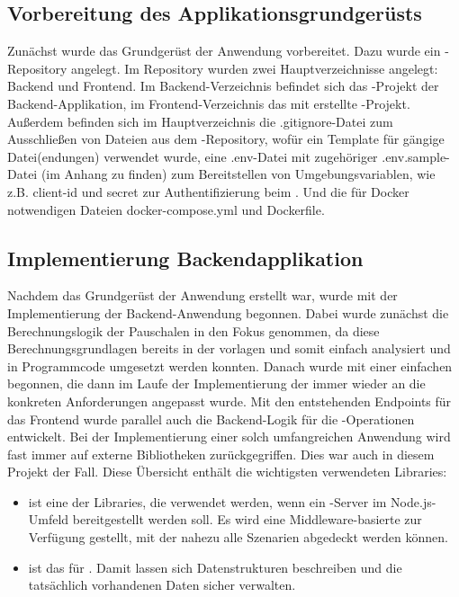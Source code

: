 \subsection{Vorbereitung des Applikationsgrundgerüsts}

Zunächst wurde das Grundgerüst der Anwendung vorbereitet. Dazu wurde ein -Repository angelegt. Im Repository wurden zwei Hauptverzeichnisse angelegt: Backend und Frontend. Im Backend-Verzeichnis befindet sich das -Projekt der Backend-Applikation, im Frontend-Verzeichnis das mit  erstellte  -Projekt. Außerdem befinden sich im Hauptverzeichnis die .gitignore-Datei zum Ausschließen von Dateien aus dem -Repository, wofür ein Template für gängige Datei(endungen) verwendet wurde, eine .env-Datei mit zugehöriger .env.sample-Datei (im Anhang zu finden) zum Bereitstellen von Umgebungsvariablen, wie z.B. client-id und secret zur Authentifizierung beim . Und die für Docker notwendigen Dateien docker-compose.yml und Dockerfile.

\subsection{Implementierung Backendapplikation}

Nachdem das Grundgerüst der Anwendung erstellt war, wurde mit der Implementierung der Backend-Anwendung begonnen. Dabei wurde zunächst die Berechnungslogik der Pauschalen in den Fokus genommen, da diese Berechnungsgrundlagen bereits in der  vorlagen und somit einfach analysiert und in Programmcode umgesetzt werden konnten. Danach wurde mit einer einfachen   begonnen, die dann im Laufe der Implementierung der  immer wieder an die konkreten Anforderungen angepasst wurde. Mit den entstehenden Endpoints für das Frontend wurde parallel auch die Backend-Logik für die -Operationen entwickelt. Bei der Implementierung einer solch umfangreichen Anwendung wird fast immer auf externe Bibliotheken zurückgegriffen. Dies war auch in diesem Projekt der Fall. Diese Übersicht enthält die wichtigsten verwendeten Libraries:

\begin{itemize}
    \item {} ist eine der Libraries, die verwendet werden, wenn ein -Server im Node.js-Umfeld bereitgestellt werden soll. Es wird eine Middleware-basierte  zur Verfügung gestellt, mit der nahezu alle Szenarien abgedeckt werden können.
    \item {} ist das  für . Damit lassen sich Datenstrukturen beschreiben und die tatsächlich vorhandenen Daten sicher verwalten.
\end{itemize}

